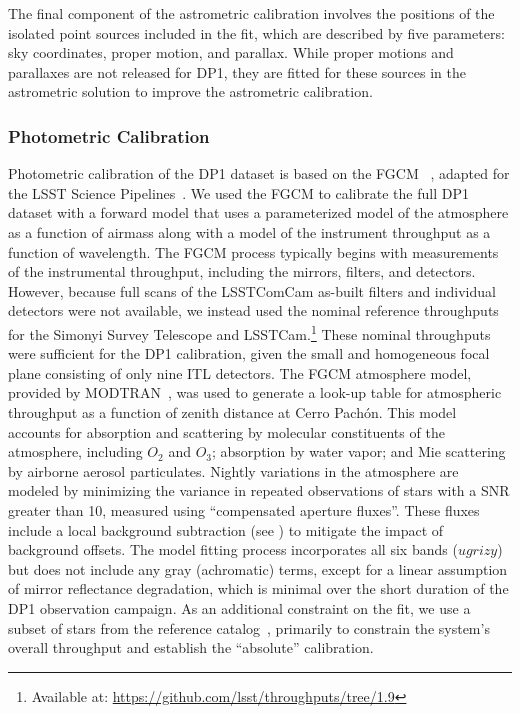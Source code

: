 The final component of the astrometric \gls{calibration} involves the positions of the isolated point sources included in the fit, which are described by five parameters: sky coordinates, proper motion, and parallax.
While proper motions and parallaxes are not released for DP1, they are fitted for these sources in the astrometric solution to improve the astrometric calibration.

\subsubsection{Photometric Calibration}
\label{photometric_calibration}
Photometric \gls{calibration} of the \gls{DP1} dataset is based on the \gls{FGCM} ~\citep[FGCM][]{2018AJ....155...41B}, adapted for the LSST Science Pipelines~\citep{2022PASJ...74..247A, SITCOMTN-086}.
We used the \gls{FGCM} to calibrate the full \gls{DP1} dataset with a forward model that uses a parameterized model of the atmosphere as a function of airmass along with a model of the instrument throughput as a function of wavelength.
The FGCM process typically begins with measurements of the instrumental throughput, including the mirrors, filters, and detectors.
However, because full scans of the \gls{LSSTComCam} as-built filters and individual detectors were not available, we instead used the nominal reference throughputs for the Simonyi Survey Telescope and LSSTCam.\footnote{Available at: \url{https://github.com/lsst/throughputs/tree/1.9}}
These nominal throughputs were sufficient for the \gls{DP1} calibration, given the small and homogeneous focal plane consisting of only nine \gls{ITL} detectors.
The FGCM atmosphere model, provided by MODTRAN~\citep{1999SPIE.3756..348B}, was used to generate a look-up table for atmospheric throughput as a function of zenith distance at Cerro Pachón.
This model accounts for absorption and scattering by molecular constituents of the atmosphere, including $O_2$ and $O_3$; absorption by water vapor; and Mie scattering by airborne aerosol particulates.
Nightly variations in the atmosphere are modeled by minimizing the variance in repeated observations of stars with a \gls{SNR} greater than 10, measured using ``compensated aperture fluxes''.
These fluxes include a local \gls{background} subtraction (see ) to mitigate the impact of \gls{background} offsets.
The model fitting process incorporates all six bands ($ugrizy$) but does not include any gray (achromatic) terms, except for a linear assumption of mirror reflectance degradation, which is minimal over the short duration of the \gls{DP1} observation campaign.
As an additional constraint on the fit, we use a subset of stars from the reference catalog~\citep{DMTN-277}, primarily to constrain the system's overall throughput and establish the ``absolute'' calibration.

